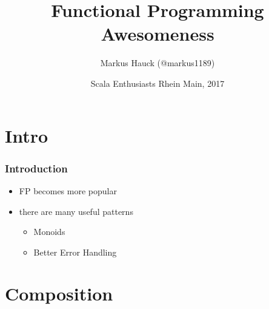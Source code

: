 \documentclass{beamer}
\title{Functional Programming Awesomeness}
\author{Markus Hauck (@markus1189)}
\date{Scala Enthusiasts Rhein Main, 2017}
\begin{document}
{
  \frame[plain]{\titlepage}
}

\section{Intro}
\label{sec:intro}

\begin{frame}
  \frametitle{Introduction}
  \begin{itemize}
  \item FP becomes more popular
  \item there are many useful patterns
    \begin{itemize}
    \item Monoids
    \item Better Error Handling
    \end{itemize}
  \end{itemize}
\end{frame}

\section{Composition}
\end{document}
